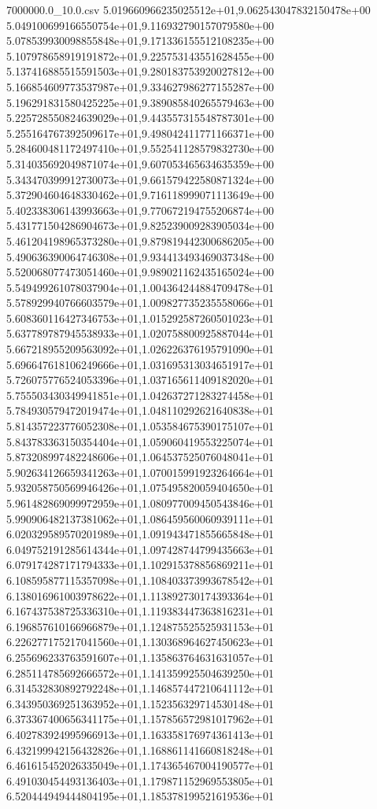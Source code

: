 \begin{filecontents*}{7000000.0_10.0.csv}
5.019660966235025512e+01,9.062543047832150478e+00
5.049100699166550754e+01,9.116932790157079580e+00
5.078539930098855848e+01,9.171336155512108235e+00
5.107978658919191872e+01,9.225753143551628455e+00
5.137416885515591503e+01,9.280183753920027812e+00
5.166854609773537987e+01,9.334627986277155287e+00
5.196291831580425225e+01,9.389085840265579463e+00
5.225728550824639029e+01,9.443557315548787301e+00
5.255164767392509617e+01,9.498042411771166371e+00
5.284600481172497410e+01,9.552541128579832730e+00
5.314035692049871074e+01,9.607053465634635359e+00
5.343470399912730073e+01,9.661579422580871324e+00
5.372904604648330462e+01,9.716118999071113649e+00
5.402338306143993663e+01,9.770672194755206874e+00
5.431771504286904673e+01,9.825239009283905034e+00
5.461204198965373280e+01,9.879819442300686205e+00
5.490636390064746308e+01,9.934413493469037348e+00
5.520068077473051460e+01,9.989021162435165024e+00
5.549499261078037904e+01,1.004364244884709478e+01
5.578929940766603579e+01,1.009827735235558066e+01
5.608360116427346753e+01,1.015292587260501023e+01
5.637789787945538933e+01,1.020758800925887044e+01
5.667218955209563092e+01,1.026226376195791090e+01
5.696647618106249666e+01,1.031695313034651917e+01
5.726075776524053396e+01,1.037165611409182020e+01
5.755503430349941851e+01,1.042637271283274458e+01
5.784930579472019474e+01,1.048110292621640838e+01
5.814357223776052308e+01,1.053584675390175107e+01
5.843783363150354404e+01,1.059060419553225074e+01
5.873208997482248606e+01,1.064537525076048041e+01
5.902634126659341263e+01,1.070015991923264664e+01
5.932058750569946426e+01,1.075495820059404650e+01
5.961482869099972959e+01,1.080977009450543846e+01
5.990906482137381062e+01,1.086459560060939111e+01
6.020329589570201989e+01,1.091943471855665848e+01
6.049752191285614344e+01,1.097428744799435663e+01
6.079174287171794333e+01,1.102915378856869211e+01
6.108595877115357098e+01,1.108403373993678542e+01
6.138016961003978622e+01,1.113892730174393364e+01
6.167437538725336310e+01,1.119383447363816231e+01
6.196857610166966879e+01,1.124875525525931153e+01
6.226277175217041560e+01,1.130368964627450623e+01
6.255696233763591607e+01,1.135863764631631057e+01
6.285114785692666572e+01,1.141359925504639250e+01
6.314532830892792248e+01,1.146857447210641112e+01
6.343950369251363952e+01,1.152356329714530148e+01
6.373367400656341175e+01,1.157856572981017962e+01
6.402783924995966913e+01,1.163358176974361413e+01
6.432199942156432826e+01,1.168861141660818248e+01
6.461615452026335049e+01,1.174365467004190577e+01
6.491030454493136403e+01,1.179871152969553805e+01
6.520444949444804195e+01,1.185378199521619536e+01

\end{filecontents*}
